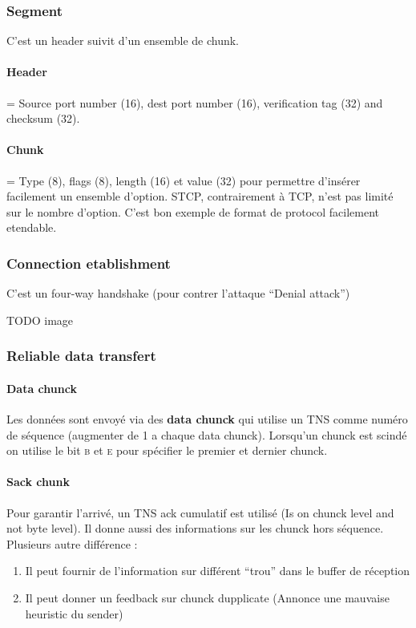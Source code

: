 \subsubsection{Segment}
C'est un header suivit d'un ensemble de chunk.

\paragraph{Header} = Source port number (16), dest port number (16), verification tag (32) and checksum (32).

\paragraph{Chunk} = Type (8), flags (8), length (16) et value (32) pour permettre d'insérer facilement un ensemble d'option. STCP, contrairement à TCP, n'est pas limité sur le nombre d'option. C'est bon exemple de format de protocol facilement etendable.

\subsubsection{Connection etablishment}
C'est un four-way handshake (pour contrer l'attaque ``Denial attack'')

TODO image

\subsubsection{Reliable data transfert}

\paragraph{Data chunck}
Les données sont envoyé via des \textbf{data chunck} qui utilise un TNS comme
numéro de séquence (augmenter de 1 a chaque data chunck). Lorsqu'un chunck est
scindé on utilise le bit \textsc{b} et \textsc{e} pour spécifier le premier et dernier
chunck.

\paragraph{Sack chunk}
Pour garantir l'arrivé, un TNS ack cumulatif est utilisé (Is on chunck level and not
byte level). Il donne aussi des informations sur les chunck hors séquence.
Plusieurs autre différence :
\begin{enumerate}
    \item Il peut fournir de l'information sur différent ``trou'' dans le buffer de réception
    \item Il peut donner un feedback sur chunck dupplicate (Annonce une mauvaise heuristic du sender)
\end{enumerate}

